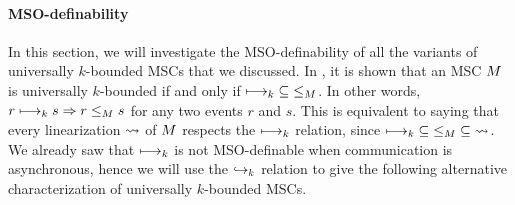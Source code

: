 


\paragraph*{MSO-definability}

In this section, we will investigate the MSO-definability of all the variants of universally $k$-bounded MSCs that we discussed.
In \cite{DBLP:conf/fossacs/LohreyM02}, it is shown that an MSC $M$ is universally $k$-bounded if and only if $\longmapsto_k \;\subseteq\; \le_M$. In other words, $r \longmapsto_k s \Rightarrow r \le_M s$ for any two events $r$ and $s$. This is equivalent to saying that every linearization $\rightsquigarrow$ of $M$ respects the $\longmapsto_k$ relation, since $\longmapsto_k \;\subseteq\; \le_M \;\subseteq\; \rightsquigarrow$. We already saw that $\longmapsto_k$ is not MSO-definable when communication is asynchronous, hence we will use the $\hookrightarrow_{k}$ relation to give the following alternative characterization of universally $k$-bounded MSCs.

